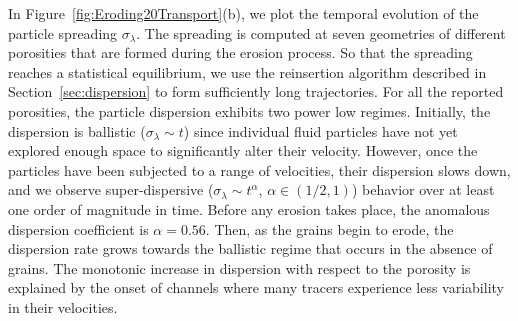 \documentclass[preprint,10pt]{elsarticle}
\begin{document}
In Figure~\ref{fig:Eroding20Transport}(b), we plot the temporal
evolution of the particle spreading $\sigma_\lambda$.  The spreading is
computed at seven geometries of different porosities that are formed
during the erosion process.  So that the spreading reaches a statistical
equilibrium, we use the reinsertion algorithm described in
Section~\ref{sec:dispersion} to form sufficiently long trajectories.
For all the reported porosities, the particle dispersion exhibits two
power low regimes.  Initially, the dispersion is ballistic
($\sigma_\lambda \sim t$) since individual fluid particles have not yet
explored enough space to significantly alter their velocity.  However,
once the particles have been subjected to a range of velocities, their
dispersion slows down, and we observe super-dispersive ($\sigma_\lambda
\sim t^\alpha$, $\alpha \in (1/2,1)$) behavior over at least one order
of magnitude in time.  Before any erosion takes place, the anomalous
dispersion coefficient is $\alpha = 0.56$.  Then, as the grains begin to
erode, the dispersion rate grows towards the ballistic regime that
occurs in the absence of grains.  The monotonic increase in dispersion
with respect to the porosity is explained by the onset of channels where
many tracers experience less variability in their velocities.
\end{document}
